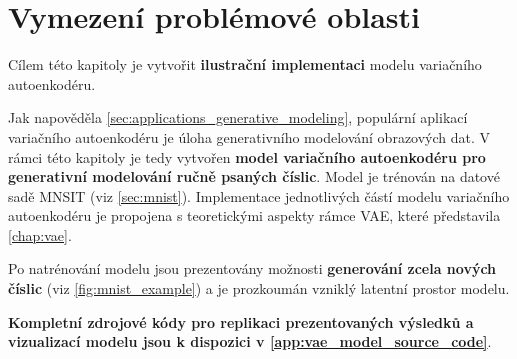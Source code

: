 \section{Vymezení problémové oblasti}
Cílem této kapitoly je vytvořit \textbf{ilustrační implementaci} modelu variačního autoenkodéru.

Jak napověděla \autoref{sec:applications_generative_modeling}, populární aplikací variačního autoenkodéru je úloha generativního modelování obrazových dat.
V rámci této kapitoly je tedy vytvořen \textbf{model variačního autoenkodéru pro generativní modelování ručně psaných číslic}.
Model je trénován na datové sadě MNSIT (viz \autoref{sec:mnist}).
Implementace jednotlivých částí modelu variačního autoenkodéru je propojena s teoretickými aspekty rámce VAE, které představila \autoref{chap:vae}.

Po natrénování modelu jsou prezentovány možnosti \textbf{generování zcela nových číslic} (viz \autoref{fig:mnist_example}) a je prozkoumán vzniklý latentní prostor modelu.

\textbf{Kompletní zdrojové kódy pro replikaci prezentovaných výsledků a vizualizací modelu jsou k dispozici v \autoref{app:vae_model_source_code}}.